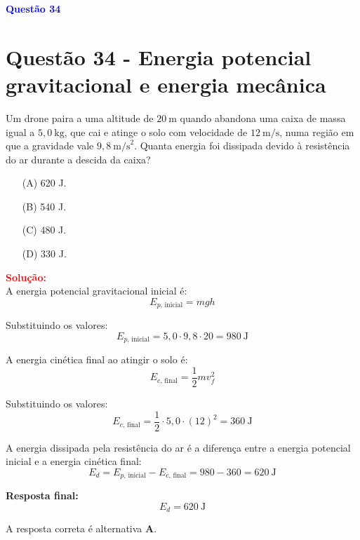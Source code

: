 \documentclass[a4paper,12pt]{article}
\begin{document}
\begin{flushleft}

\textbf{\textcolor{blue}{\Large Quest\~ao 34}}\\
\noindent
\section{Quest\~ao 34 - Energia potencial gravitacional e energia mecânica}
Um drone paira a uma altitude de \(20~\mathrm{m}\) quando abandona
uma caixa de massa igual a \(5,0~\mathrm{kg}\), que cai e atinge o solo
com velocidade de \(12~\mathrm{m/s}\), numa região em que a gravidade
vale \(9,8~\mathrm{m/s}^2\). Quanta energia foi dissipada devido à
resistência do ar durante a descida da caixa?

\begin{itemize}
\item[(A)] 620 J.
\item[(B)] 540 J.
\item[(C)] 480 J.
\item[(D)] 330 J.
\end{itemize}

\vspace{0.5cm}

\textcolor{red}{\textbf{Solução:}}\\

A energia potencial gravitacional inicial é:
\begin{equation*}
E_{p,\,\text{inicial}} = m g h
\end{equation*}

Substituindo os valores:
\begin{equation*}
E_{p,\,\text{inicial}} = 5,0 \cdot 9,8 \cdot 20 = 980~\mathrm{J}
\end{equation*}

A energia cinética final ao atingir o solo é:
\begin{equation*}
E_{c,\,\text{final}} = \frac{1}{2} m v_f^2
\end{equation*}

Substituindo os valores:
\begin{equation*}
E_{c,\,\text{final}} = \frac{1}{2} \cdot 5,0 \cdot (12)^2 = 360~\mathrm{J}
\end{equation*}

A energia dissipada pela resistência do ar é a diferença entre a energia potencial inicial e a energia cinética final:
\begin{equation*}
E_d = E_{p,\,\text{inicial}} - E_{c,\,\text{final}} = 980 - 360 = 620~\mathrm{J}
\end{equation*}

\textbf{Resposta final:}
\begin{equation*}
\boxed{E_d = 620~\mathrm{J}}
\end{equation*}

A resposta correta é alternativa \colorbox{green!50}{\textbf{A}}.

\end{flushleft}
\end{document}
